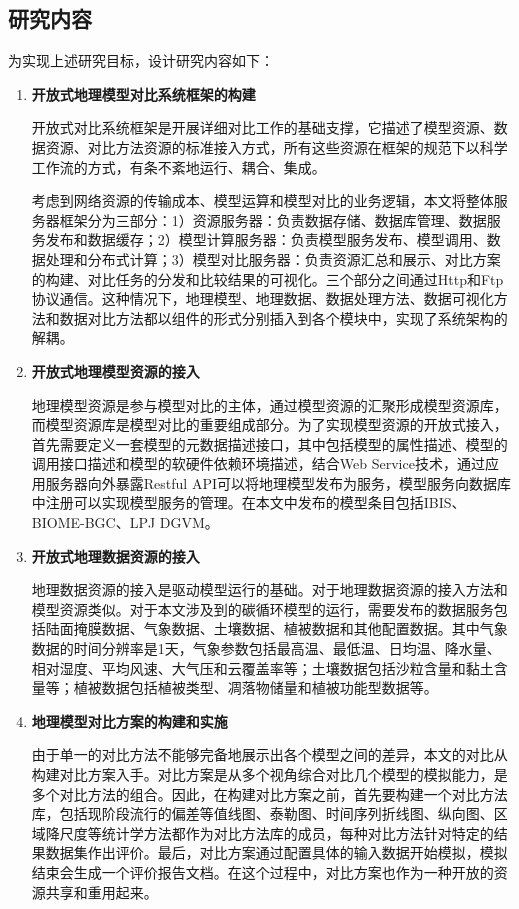 \subsection{研究内容}
为实现上述研究目标，设计研究内容如下：
\begin{enumerate}[(1)]
\item \textbf{开放式地理模型对比系统框架的构建}

开放式对比系统框架是开展详细对比工作的基础支撑，它描述了模型资源、数据资源、对比方法资源的标准接入方式，所有这些资源在框架的规范下以科学工作流的方式，有条不紊地运行、耦合、集成。

考虑到网络资源的传输成本、模型运算和模型对比的业务逻辑，本文将整体服务器框架分为三部分：1）资源服务器：负责数据存储、数据库管理、数据服务发布和数据缓存；2）模型计算服务器：负责模型服务发布、模型调用、数据处理和分布式计算；3）模型对比服务器：负责资源汇总和展示、对比方案的构建、对比任务的分发和比较结果的可视化。三个部分之间通过Http和Ftp协议通信。这种情况下，地理模型、地理数据、数据处理方法、数据可视化方法和数据对比方法都以组件的形式分别插入到各个模块中，实现了系统架构的解耦。

\item \textbf{开放式地理模型资源的接入}

地理模型资源是参与模型对比的主体，通过模型资源的汇聚形成模型资源库，而模型资源库是模型对比的重要组成部分。为了实现模型资源的开放式接入，首先需要定义一套模型的元数据描述接口，其中包括模型的属性描述、模型的调用接口描述和模型的软硬件依赖环境描述，结合Web Service技术，通过应用服务器向外暴露Restful API可以将地理模型发布为服务，模型服务向数据库中注册可以实现模型服务的管理。在本文中发布的模型条目包括IBIS、BIOME-BGC、LPJ DGVM。

\item \textbf{开放式地理数据资源的接入}

地理数据资源的接入是驱动模型运行的基础。对于地理数据资源的接入方法和模型资源类似。对于本文涉及到的碳循环模型的运行，需要发布的数据服务包括陆面掩膜数据、气象数据、土壤数据、植被数据和其他配置数据。其中气象数据的时间分辨率是1天，气象参数包括最高温、最低温、日均温、降水量、相对湿度、平均风速、大气压和云覆盖率等；土壤数据包括沙粒含量和黏土含量等；植被数据包括植被类型、凋落物储量和植被功能型数据等。

\item \textbf{地理模型对比方案的构建和实施}

由于单一的对比方法不能够完备地展示出各个模型之间的差异，本文的对比从构建对比方案入手。对比方案是从多个视角综合对比几个模型的模拟能力，是多个对比方法的组合。因此，在构建对比方案之前，首先要构建一个对比方法库，包括现阶段流行的偏差等值线图、泰勒图、时间序列折线图、纵向图、区域降尺度等统计学方法都作为对比方法库的成员，每种对比方法针对特定的结果数据集作出评价。最后，对比方案通过配置具体的输入数据开始模拟，模拟结束会生成一个评价报告文档。在这个过程中，对比方案也作为一种开放的资源共享和重用起来。
\end{enumerate}


